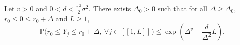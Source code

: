 \begin{lemma}[Lemma 3.4]
Let $v>0$ and $0<d<\frac{\pi^2}2\sigma^2$. There exists $\Delta_0>0$ such that for all $\Delta\ge\Delta_0$, $r_0\le 0\le r_0+\Delta$ and $L\ge 1$,
\[
    \mathbb P\big(r_0\le Y_j\le r_0+\Delta,\ \forall j\in[\![1,L]\!]\big)
    \le
    \exp\!\left(\Delta^v-\frac{d}{\Delta^2}L\right).
\]
\end{lemma}
